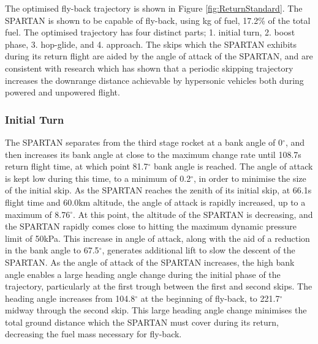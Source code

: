 The optimised fly-back trajectory is shown in Figure \ref{fig:ReturnStandard}.
The SPARTAN is shown to be capable of fly-back, using \returnFuelStandard kg of fuel, 17.2\% of the total fuel.
The optimised trajectory has four distinct parts; 1. initial turn, 2. boost phase, 3. hop-glide, and 4. approach. 
 The skips which the SPARTAN exhibits during its return flight are aided by the angle of attack of the SPARTAN, and are consistent with research which has shown that a periodic skipping trajectory increases the downrange distance achievable by hypersonic vehicles both during powered and unpowered flight\cite{Eggers1957,Kanda2007}. 
 
\subsubsection{ Initial Turn}
The SPARTAN separates from the third stage rocket at a bank angle of 0$^\circ$, and then increases its bank angle at close to the maximum change rate until 108.7s return flight time, at which point 81.7$^\circ$ bank angle is reached.
The angle of attack is kept low during this time, to a minimum of 0.2$^\circ$, in order to minimise the size of the initial skip. 
As the SPARTAN reaches the zenith of its initial skip, at 66.1s flight time and 60.0km altitude, the angle of attack is rapidly increased, up to a maximum of 8.76$^\circ$. 
 At this point, the altitude of the SPARTAN is decreasing, and the SPARTAN rapidly comes close to hitting the maximum dynamic pressure limit of 50kPa. This increase in angle of attack, along with the aid of a reduction in the bank angle to 67.5$^\circ$, generates additional lift to slow the descent of the SPARTAN. 
As the angle of attack of the SPARTAN increases, the high bank angle enables a large heading angle change during the initial phase of the trajectory, particularly at the first trough between the first and second skips. The heading angle increases from 104.8$^\circ$ at the beginning of fly-back, to 221.7$^\circ$ midway through the second skip. This large heading angle change minimises the total ground distance which the SPARTAN must cover during its return, decreasing the fuel mass necessary for fly-back. 

